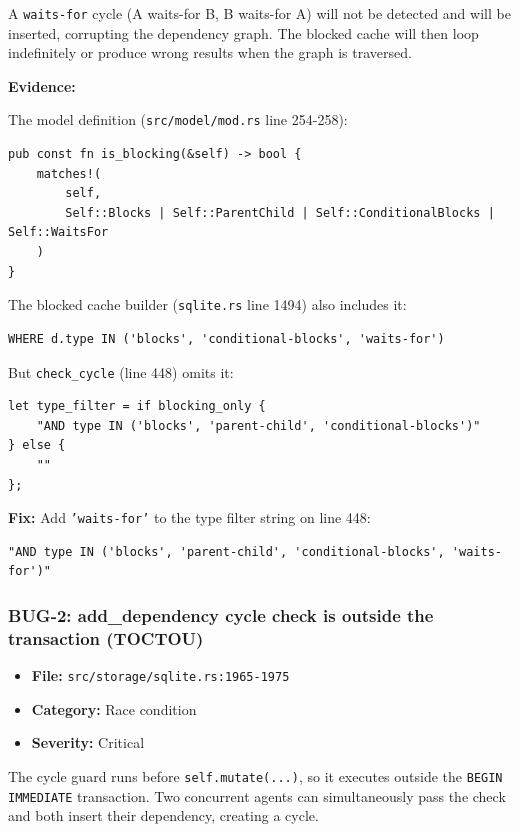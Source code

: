 \documentclass[twocolumn,10pt,letterpaper]{article}
\begin{document}
A \texttt{waits-for} cycle (A waits-for B, B waits-for A) will not be detected and will be inserted, corrupting the dependency graph. The blocked cache will then loop indefinitely or produce wrong results when the graph is traversed.


\textbf{Evidence:}


The model definition (\texttt{src/model/mod.rs} line 254-258):


\begin{lstlisting}
pub const fn is_blocking(&self) -> bool {
    matches!(
        self,
        Self::Blocks | Self::ParentChild | Self::ConditionalBlocks | Self::WaitsFor
    )
}
\end{lstlisting}

The blocked cache builder (\texttt{sqlite.rs} line 1494) also includes it:


\begin{lstlisting}
WHERE d.type IN ('blocks', 'conditional-blocks', 'waits-for')
\end{lstlisting}

But \texttt{check\_cycle} (line 448) omits it:


\begin{lstlisting}
let type_filter = if blocking_only {
    "AND type IN ('blocks', 'parent-child', 'conditional-blocks')"
} else {
    ""
};
\end{lstlisting}

\textbf{Fix:} Add \texttt{'waits-for'} to the type filter string on line 448:


\begin{lstlisting}
"AND type IN ('blocks', 'parent-child', 'conditional-blocks', 'waits-for')"
\end{lstlisting}

\subsubsection{BUG-2: add\_dependency cycle check is outside the transaction (TOCTOU)}

\begin{itemize}
\setlength{\itemsep}{0pt}
\setlength{\parskip}{0pt}
  \item \textbf{File:} \texttt{src/storage/sqlite.rs:1965-1975}
  \item \textbf{Category:} Race condition
  \item \textbf{Severity:} Critical
\end{itemize}

The cycle guard runs before \texttt{self.mutate(...)}, so it executes outside the \texttt{BEGIN IMMEDIATE} transaction. Two concurrent agents can simultaneously pass the check and both insert their dependency, creating a cycle.
\end{document}
